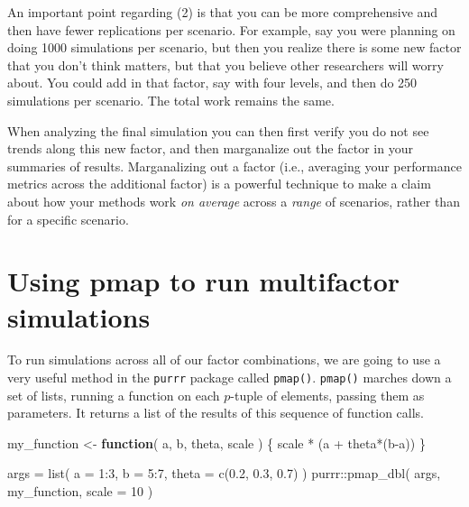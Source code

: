 \documentclass[
]{book}
\newenvironment{Shaded}{\begin{snugshade}}{\end{snugshade}}
\newcommand{\AttributeTok}[1]{\textcolor[rgb]{0.77,0.63,0.00}{#1}}
\newcommand{\ControlFlowTok}[1]{\textcolor[rgb]{0.13,0.29,0.53}{\textbf{#1}}}
\newcommand{\DecValTok}[1]{\textcolor[rgb]{0.00,0.00,0.81}{#1}}
\newcommand{\FloatTok}[1]{\textcolor[rgb]{0.00,0.00,0.81}{#1}}
\newcommand{\FunctionTok}[1]{\textcolor[rgb]{0.00,0.00,0.00}{#1}}
\newcommand{\NormalTok}[1]{#1}
\newcommand{\OtherTok}[1]{\textcolor[rgb]{0.56,0.35,0.01}{#1}}
\newcommand{\SpecialCharTok}[1]{\textcolor[rgb]{0.00,0.00,0.00}{#1}}
\begin{document}
An important point regarding (2) is that you can be more comprehensive and then have fewer replications per scenario.
For example, say you were planning on doing 1000 simulations per scenario, but then you realize there is some new factor that you don't think matters, but that you believe other researchers will worry about.
You could add in that factor, say with four levels, and then do 250 simulations per scenario.
The total work remains the same.

When analyzing the final simulation you can then first verify you do not see trends along this new factor, and then marganalize out the factor in your summaries of results.
Marganalizing out a factor (i.e., averaging your performance metrics across the additional factor) is a powerful technique to make a claim about how your methods work \emph{on average} across a \emph{range} of scenarios, rather than for a specific scenario.

\hypertarget{using-pmap-to-run-multifactor-simulations}{%
\section{Using pmap to run multifactor simulations}\label{using-pmap-to-run-multifactor-simulations}}

To run simulations across all of our factor combinations, we are going to use a very useful method in the \texttt{purrr} package called \texttt{pmap()}.
\texttt{pmap()} marches down a set of lists, running a function on each \(p\)-tuple of elements, passing them as parameters.
It returns a list of the results of this sequence of function calls.

\begin{Shaded}
\begin{Highlighting}[]
\NormalTok{my\_function }\OtherTok{\textless{}{-}} \ControlFlowTok{function}\NormalTok{( a, b, theta, scale ) \{}
\NormalTok{    scale }\SpecialCharTok{*}\NormalTok{ (a }\SpecialCharTok{+}\NormalTok{ theta}\SpecialCharTok{*}\NormalTok{(b}\SpecialCharTok{{-}}\NormalTok{a))}
\NormalTok{\}}

\NormalTok{args }\OtherTok{=} \FunctionTok{list}\NormalTok{( }\AttributeTok{a =} \DecValTok{1}\SpecialCharTok{:}\DecValTok{3}\NormalTok{, }
             \AttributeTok{b =} \DecValTok{5}\SpecialCharTok{:}\DecValTok{7}\NormalTok{, }
             \AttributeTok{theta =} \FunctionTok{c}\NormalTok{(}\FloatTok{0.2}\NormalTok{, }\FloatTok{0.3}\NormalTok{, }\FloatTok{0.7}\NormalTok{) )}
\NormalTok{purrr}\SpecialCharTok{::}\FunctionTok{pmap\_dbl}\NormalTok{(  args, my\_function, }\AttributeTok{scale =} \DecValTok{10}\NormalTok{ )}
\end{Highlighting}
\end{Shaded}
\end{document}
